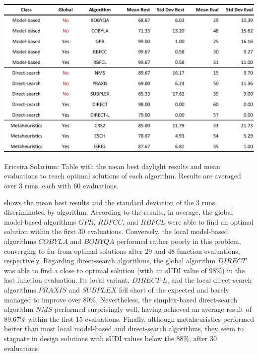 \begin{table}[htbp]
	\centering
	\includegraphics[width=\textwidth]{tables_and_code/Ericeira_phase1_stats_v1.pdf}
	\caption[Ericeira Solarium: Mean best results and evaluations discriminated per algorithm]{Ericeira Solarium: Table with the mean best daylight results and mean evaluations to reach optimal solutions of each algorithm. Results are averaged over $3$ runs, each with $60$ evaluations.}
	\label{table:phase1results}
\end{table}

 shows the mean best results and the standard deviation of the $3$ runs,  discriminated by algorithm. According to the results, in average, the global model-based algorithms $GPR$, $RBFCC$, and $RBFCL$ were able to find an optimal solution within the first $30$ evaluations. Conversely, the local model-based algorithms $COBYLA$ and $BOBYQA$ performed rather poorly in this problem, converging to far from optimal solutions after $29$ and $48$ function evaluations, respectively. Regarding direct-search algorithms, the global algorithm $DIRECT$ was able to find a close to optimal solution (with an \ac{sUDI} value of $98\%$) in the last function evaluation. Its local variant, $DIRECT$-$L$, and the local direct-search algorithms $PRAXIS$ and $SUBPLEX$ fell short of the expected and barely managed to improve over $80\%$. Nevertheless, the simplex-based direct-search algorithm $NMS$ performed surprisingly well, having achieved an average result of $89.67\%$ within the first $15$ evaluations. Finally, although metaheuristics performed better than most local model-based and direct-search algorithms, they seem to stagnate in design solutions with \ac{sUDI} values below the $88\%$, after $30$ evaluations.

